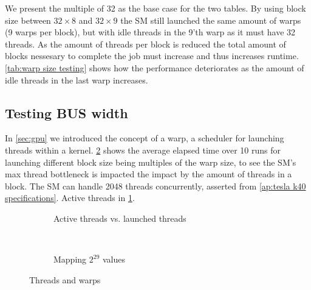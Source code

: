 We present the multiple of 32 as the base case for the two tables.
By using block size between $32 \times 8$ and $32 \times 9$ the SM still launched the same amount of warps (9 warps per block), but with idle threads in the 9'th warp as it must have 32 threads.
As the amount of threads per block is reduced the total amount of blocks nessesary to complete the job must increase and thus increases runtime.
\cref{tab:warp size testing} shows how the performance deteriorates as the amount of idle threads in the last warp increases.

\subsection{Testing BUS width}
\label{sec:testing BUS width}

In \cref{sec:gpu} we introduced the concept of a warp, a scheduler for launching threads within a kernel.
\cref{fig:block size testing} shows the average elapsed time over 10 runs for launching different block size being multiples of the warp size, to see the SM's max thread bottleneck is impacted the impact by the amount of threads in a block.
The SM can handle 2048 threads concurrently, asserted from \cref{ap:tesla k40 specifications}.
Active threads in \cref{fig:active threads}.


\begin{figure*}[t]
  \centering
  \begin{subfigure}[b]{.49\linewidth}
    \centering
    \resizebox{!}{.80\textwidth}{
      
    }
    \caption{Active threads vs. launched threads}
    \label{fig:active threads}
  \end{subfigure}%
  ~
  \begin{subfigure}[b]{.49\linewidth}
    \centering
    \resizebox{!}{.80\textwidth}{
      
    }
    \caption{Mapping $2^{29}$ values}
    \label{fig:block size testing}
  \end{subfigure}%
  \caption{Threads and warps}
  \label{fig:threads and warps}
\end{figure*}

